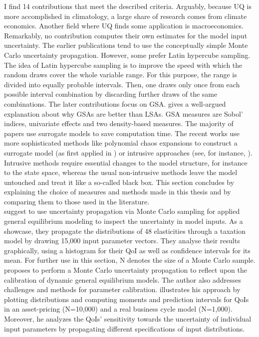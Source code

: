 I find 14 contributions that meet the described criteria. Arguably, because UQ is more accomplished in climatology, a large share of research comes from climate economics. Another field where UQ finds some application is macroeconomics. Remarkably, no contribution computes their own estimates for the model input uncertainty. The earlier publications tend to use the conceptually simple Monte Carlo uncertainty propagation. However, some prefer Latin hypercube sampling. The idea of Latin hypercube sampling is to improve the speed with which the random draws cover the whole variable range. For this purpose, the range is divided into equally probable intervals. Then, one draws only once from each possible interval combination by discarding further draws of the same combinations. The later contributions focus on GSA. \cite{Harenberg.2019} gives a well-argued explanation about why GSAs are better than LSAs. GSA measures are Sobol' indices, univariate effects and two density-based measures. The majority of papers use surrogate models to save computation time. The recent works use more sophisticated methods like polynomial chaos expansions to construct a surrogate model (as first applied in \cite{Harenberg.2019}) or intrusive approaches (see, for instance, \cite{Scheidegger.2019}). Intrusive methods require essential changes to the model structure, for instance to the state space, whereas the usual non-intrusive methods leave the model untouched and treat it like a so-called black box. This section concludes by explaining the choice of measures and methods made in this thesis and by comparing them to those used in the literature.\\
\newline
\cite{Harrison.1992} suggest to use uncertainty propagation via Monte Carlo sampling for applied general equilibrium modeling to inspect the uncertainty in model inputs. As a showcase, they propagate the distributions of 48 elasticities through a taxation model by drawing 15,000 input parameter vectors. They analyse their results graphically, using a histogram for their QoI as well as confidence intervals for its mean. For further use in this section, N denotes the size of a Monte Carlo sample.\\
\newline
\cite{Canova.1994} proposes to perform a Monte Carlo uncertainty propagation to reflect upon the calibration of dynamic general equilibrium models. The author also addresses challenges and methods for parameter calibration. \citeauthor{Canova.1994} illustrates his approach by plotting distributions and computing moments and prediction intervals for QoIs in an asset-pricing (N=10,000) and a real business cycle model (N=1,000). Moreover, he analyzes the QoIs' sensitivity towards the uncertainty of individual input parameters by propagating different specifications of input distributions.\\
